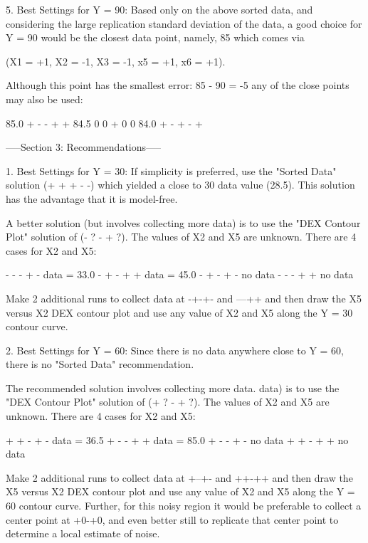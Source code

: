    5. Best Settings for Y = 90:
      Based only on the above sorted data, and
      considering the large replication standard
      deviation of the data, a good choice for Y =
      90 would be the closest data point, namely,
      85 which comes via

         (X1 = +1, X2 = -1, X3 = -1, x5 = +1, x6 = +1).

      Although this point has the smallest error:
      85 - 90 = -5 any of the close points may
      also be used:

            85.0     + - - + +
            84.5     0 0 + 0 0
            84.0     + - + - +

-----Section 3: Recommendations-----

1. Best Settings for Y = 30:
   If simplicity is preferred, use the "Sorted
   Data" solution (+ + + - -) which yielded a
   close to 30 data value (28.5).  This solution
   has the advantage that it is model-free.

   A better solution (but involves collecting more
   data) is to use the "DEX Contour Plot" solution
   of (- ? - + ?).  The values of X2 and X5 are
   unknown.  There are 4 cases for X2 and X5:

      - - - + -   data = 33.0
      - + - + +   data = 45.0
      - + - + -   no data
      - - - + +   no data

   Make 2 additional runs to collect data at -+-+-
   and ---++ and then draw the X5 versus X2 DEX
   contour plot and use any value of X2 and X5
   along the Y = 30 contour curve.

2. Best Settings for Y = 60:
   Since there is no data anywhere close to Y =
   60, there is no "Sorted Data" recommendation.

   The recommended solution involves collecting
   more data.  data) is to use the "DEX Contour
   Plot" solution of (+ ? - + ?).  The values
   of X2 and X5 are unknown.  There are 4 cases
   for X2 and X5:

      + + - + -   data = 36.5
      + - - + +   data = 85.0
      + - - + -   no data
      + + - + +   no data

   Make 2 additional runs to collect data at
   +--+- and ++-++ and then draw the X5 versus
   X2 DEX contour plot and use any value of X2
   and X5 along the Y = 60 contour curve.
   Further, for this noisy region it would be
   preferable to collect a center point at
   +0-+0, and even better still to replicate
   that center point to determine a local
   estimate of noise.

